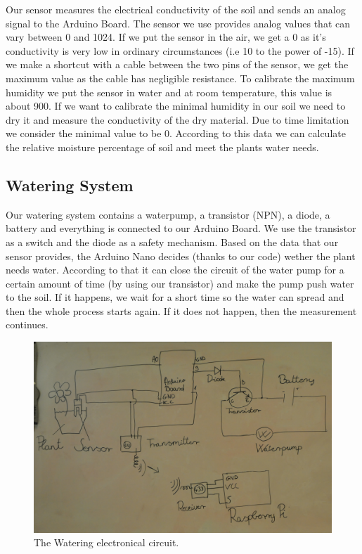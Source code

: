 \documentclass[conference]{IEEEtran}
\begin{document}
Our sensor measures the electrical conductivity of the soil and sends an analog signal to the Arduino Board.
The sensor we use provides analog values that can vary between 0 and 1024.
If we put the sensor in the air, we get a 0 as it's conductivity is very low in ordinary circumstances (i.e 10 to the power of -15).
If we make a shortcut with a cable between the two pins of the sensor, we get the maximum value as the cable has negligible resistance.
To calibrate the maximum humidity we put the sensor in water and at room temperature, this value is about 900.
If we want to calibrate the minimal humidity in our soil we need to dry it and measure the conductivity of the dry material.
Due to time limitation we consider the minimal value to be 0.
According to this data we can calculate the relative moisture percentage of soil and meet the plants water needs.

\subsection{Watering System}

Our watering system contains a waterpump, a transistor (NPN), a diode, a battery and everything is connected to our Arduino Board.
We use the transistor as a switch and the diode as a safety mechanism.
Based on the data that our sensor provides, the Arduino Nano decides (thanks to our code) wether the plant needs water.
According to that it can close the circuit of the water pump for a certain amount of time (by using our transistor) and make the pump push water to the soil.
If it happens, we wait for a short time so the water can spread and then the whole process starts again.
If it does not happen, then the measurement continues.

\begin{figure}
    \centering
    \includegraphics[width=\columnwidth]{circuit}
    \caption{The Watering electronical circuit.}
    \label{fig:circuit}
\end{figure}
\end{document}
